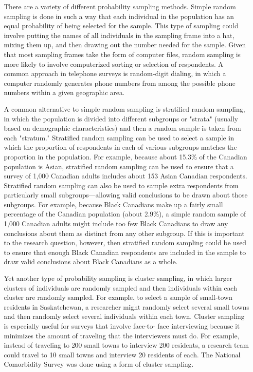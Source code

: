 There are a variety of different probability sampling methods. Simple random sampling is done in such a way that each individual in the population has an equal probability of being selected for the sample. This type of sampling could involve putting the names of all individuals in the sampling frame into a hat, mixing them up, and then drawing out the number needed for the sample. Given that most sampling frames take the form of computer files, random sampling is more likely to involve computerized sorting or selection of respondents. A common approach in telephone surveys is random-digit dialing, in which a computer randomly generates phone numbers from among the possible phone numbers within a given geographic area.

A common alternative to simple random sampling is stratified random sampling, in which the population is divided into different subgroups or "strata" (usually based on demographic characteristics) and then a random sample is taken from each "stratum." Stratified random sampling can be used to select a sample in which the proportion of respondents in each of various subgroups matches the proportion in the population. For example, because about 15.3\% of the Canadian population is Asian, stratified random sampling can be used to ensure that a survey of 1,000 Canadian adults includes about 153 Asian Canadian respondents. Stratified random sampling can also be used to sample extra respondents from particularly small subgroups---allowing valid conclusions to be drawn about those subgroups. For example, because Black Canadians make up a fairly small percentage of the Canadian population (about 2.9\%), a simple random sample of 1,000 Canadian adults might include too few Black Canadians to draw any conclusions about them as distinct from any other subgroup. If this is important to the research question, however, then stratified random sampling could be used to ensure that enough Black Canadian respondents are included in the sample to draw valid conclusions about Black Canadians as a whole.

Yet another type of probability sampling is cluster sampling, in which larger clusters of individuals are randomly sampled and then individuals within each cluster are randomly sampled. For example, to select a sample of small-town residents in Saskatchewan, a researcher might randomly select several small towns and then randomly select several individuals within each town. Cluster sampling is especially useful for surveys that involve face-to- face interviewing because it minimizes the amount of traveling that the interviewers must do. For example, instead of traveling to 200 small towns to interview 200 residents, a research team could travel to 10 small towns and interview 20 residents of each. The National Comorbidity Survey was done using a form of cluster sampling.

